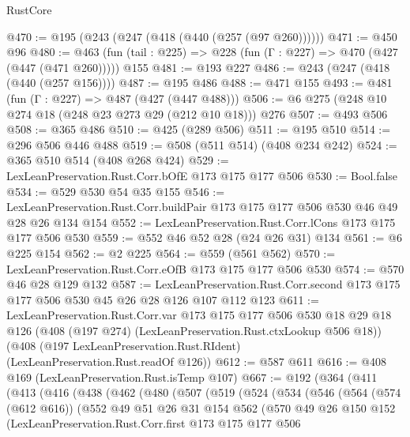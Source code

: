 \begin{lexlean}{RustCore}
\begin{coremodule}
@470 := @195 (@243 (@247 (@418 (@440 (@257 (@97 @260))))))
@471 := @450 @96
@480 := @463 (fun (tail : @225) => @228 (fun (Γ : @227) => @470 (@427 (@447 (@471 @260))))) @155
@481 := @193 @227
@486 := @243 (@247 (@418 (@440 (@257 @156))))
@487 := @195 @486
@488 := @471 @155
@493 := @481 (fun (Γ : @227) => @487 (@427 (@447 @488)))
@506 := @6 @275 (@248 @10 @274 @18 (@248 @23 @273 @29 (@212 @10 @18))) @276
@507 := @493 @506
@508 := @365 @486
@510 := @425 (@289 @506)
@511 := @195 @510
@514 := @296 @506 @446 @488
@519 := @508 (@511 @514) (@408 @234 @242)
@524 := @365 @510 @514 (@408 @268 @424)
@529 := LexLeanPreservation.Rust.Corr.bOfE @173 @175 @177 @506
@530 := Bool.false
@534 := @529 @530 @54 @35 @155
@546 := LexLeanPreservation.Rust.Corr.buildPair @173 @175 @177 @506 @530 @46 @49 @28 @26 @134 @154
@552 := LexLeanPreservation.Rust.Corr.lCons @173 @175 @177 @506 @530
@559 := @552 @46 @52 @28 (@24 @26 @31) @134
@561 := @6 @225 @154
@562 := @2 @225
@564 := @559 (@561 @562)
@570 := LexLeanPreservation.Rust.Corr.eOfB @173 @175 @177 @506 @530
@574 := @570 @46 @28 @129 @132
@587 := LexLeanPreservation.Rust.Corr.second
    @173
    @175
    @177
    @506
    @530
    @45
    @26
    @28
    @126
    @107
    @112
    @123
@611 := LexLeanPreservation.Rust.Corr.var
    @173
    @175
    @177
    @506
    @530
    @18
    @29
    @18
    @126
    (@408 (@197 @274) (LexLeanPreservation.Rust.ctxLookup @506 @18))
    (@408 (@197 LexLeanPreservation.Rust.RIdent) (LexLeanPreservation.Rust.readOf @126))
@612 := @587 @611
@616 := @408 @169 (LexLeanPreservation.Rust.isTemp @107)
@667 := @192
    (@364
      (@411
        (@413
          (@416
            (@438
              (@462
                (@480
                  (@507
                    (@519
                      (@524
                        (@534
                          (@546
                            (@564
                              (@574 (@612 @616))
                              (@552
                                @49
                                @51
                                @26
                                @31
                                @154
                                @562
                                (@570
                                  @49
                                  @26
                                  @150
                                  @152
                                  (LexLeanPreservation.Rust.Corr.first
                                    @173
                                    @175
                                    @177
                                    @506

\end{coremodule}
\end{lexlean}
